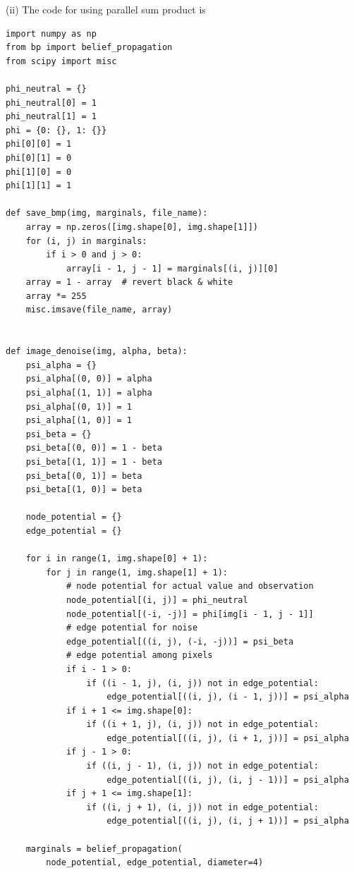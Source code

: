 \documentclass{article}
\begin{document}
\noindent
(ii) The code for using parallel sum product is
\lstset{language=Python}
\lstset{frame=lines}
\lstset{basicstyle=\footnotesize}
\begin{lstlisting}
import numpy as np
from bp import belief_propagation
from scipy import misc

phi_neutral = {}
phi_neutral[0] = 1
phi_neutral[1] = 1
phi = {0: {}, 1: {}}
phi[0][0] = 1
phi[0][1] = 0
phi[1][0] = 0
phi[1][1] = 1

def save_bmp(img, marginals, file_name):
    array = np.zeros([img.shape[0], img.shape[1]])
    for (i, j) in marginals:
        if i > 0 and j > 0:
            array[i - 1, j - 1] = marginals[(i, j)][0]
    array = 1 - array  # revert black & white
    array *= 255
    misc.imsave(file_name, array)


def image_denoise(img, alpha, beta):
    psi_alpha = {}
    psi_alpha[(0, 0)] = alpha
    psi_alpha[(1, 1)] = alpha
    psi_alpha[(0, 1)] = 1
    psi_alpha[(1, 0)] = 1
    psi_beta = {}
    psi_beta[(0, 0)] = 1 - beta
    psi_beta[(1, 1)] = 1 - beta
    psi_beta[(0, 1)] = beta
    psi_beta[(1, 0)] = beta

    node_potential = {}
    edge_potential = {}

    for i in range(1, img.shape[0] + 1):
        for j in range(1, img.shape[1] + 1):
            # node potential for actual value and observation
            node_potential[(i, j)] = phi_neutral
            node_potential[(-i, -j)] = phi[img[i - 1, j - 1]]
            # edge potential for noise
            edge_potential[((i, j), (-i, -j))] = psi_beta
            # edge potential among pixels
            if i - 1 > 0:
                if ((i - 1, j), (i, j)) not in edge_potential:
                    edge_potential[((i, j), (i - 1, j))] = psi_alpha
            if i + 1 <= img.shape[0]:
                if ((i + 1, j), (i, j)) not in edge_potential:
                    edge_potential[((i, j), (i + 1, j))] = psi_alpha
            if j - 1 > 0:
                if ((i, j - 1), (i, j)) not in edge_potential:
                    edge_potential[((i, j), (i, j - 1))] = psi_alpha
            if j + 1 <= img.shape[1]:
                if ((i, j + 1), (i, j)) not in edge_potential:
                    edge_potential[((i, j), (i, j + 1))] = psi_alpha

    marginals = belief_propagation(
        node_potential, edge_potential, diameter=4)


\end{lstlisting}
\end{document}
